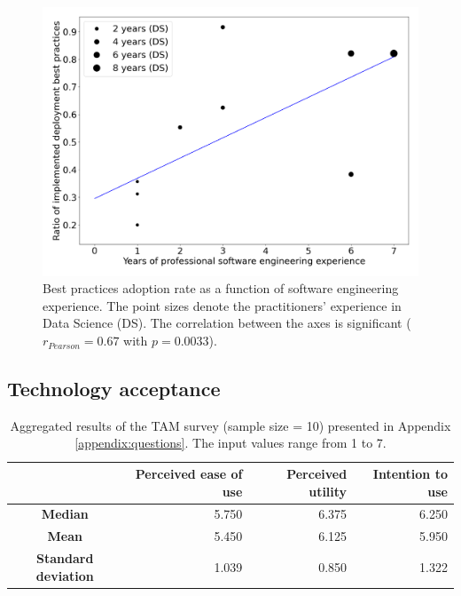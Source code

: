\begin{figure}
    \centering
    \includegraphics[width=0.6\linewidth]{figures/best-practices.png}
    \captionsetup{width=.9\linewidth}
    \caption{Best practices adoption rate as a function of software engineering experience. The point sizes denote the practitioners' experience in Data Science (DS). The correlation between the axes is significant ($r_{Pearson} = 0.67$ with $p = 0.0033$).}
    \label{fig:adoption}
\end{figure}

\subsection{Technology acceptance}

\begin{table}[H]
\centering
\captionsetup{width=.9\linewidth}
\caption{Aggregated results of the TAM survey (sample size = 10) presented in Appendix \ref{appendix:questions}. The input values range from 1 to 7.}
\label{table:tam}
{\renewcommand{\arraystretch}{1.1} %
\begin{tabular}{|c|r|r|r|} \hline
                            & \textbf{Perceived ease of use} & \textbf{Perceived utility} & \textbf{Intention to use} \\\hline
\textbf{Median}             & 5.750                          & 6.375                      & 6.250                     \\\hline
\textbf{Mean}               & 5.450                          & 6.125                      & 5.950                     \\\hline
\textbf{Standard deviation} & 1.039                          & 0.850                      & 1.322                     \\\hline
\end{tabular}}
\end{table}

